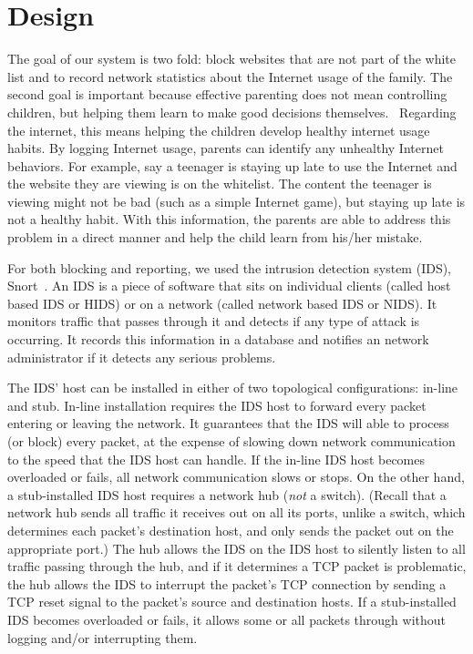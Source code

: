 
\section{Design}

The goal of our system is two fold: block websites that are not part of the
white list and to record network statistics about the Internet usage of the
family. 
%
The second goal is important because effective parenting does not mean
controlling children, but helping them learn to make good decisions
themselves.~\cite{severe}
%
Regarding the internet, this means helping the children develop healthy
internet usage habits.
%
By logging Internet usage, parents can identify any unhealthy Internet
behaviors.
%
For example, say a teenager is staying up late to use the Internet and the
website they are viewing is on the whitelist.
%
The content the teenager is viewing might not be bad (such as a simple
Internet game), but staying up late is not a healthy habit.
%
With this information, the parents are able to address this problem in a
direct manner and help the child learn from his/her mistake.

For both blocking and reporting, we used the intrusion detection system (IDS),
Snort~\cite{snort}. An IDS is a piece of software that sits on individual
clients (called host based IDS or HIDS) or on a network (called network based
IDS or NIDS). It monitors traffic that passes through it and detects if any
type of attack is occurring. It records this information in a database
and notifies an network administrator if it detects any serious problems.

The IDS' host can be installed in either of two topological configurations:
in-line and stub.
%
In-line installation requires the IDS host to forward every packet entering or
leaving the network.
%
It guarantees that the IDS will able to process (or block) every packet, at
the expense of slowing down network communication to the speed that the IDS
host can handle.
%
If the in-line IDS host becomes overloaded or fails, all network communication slows
or stops.
%
On the other hand, a stub-installed IDS host requires a network hub (\emph{not} a
switch).
%
(Recall that a network hub sends all traffic it receives out on all its ports,
unlike a switch, which determines each packet's destination host, and only
sends the packet out on the appropriate port.)
%
The hub allows the IDS on the IDS host to silently listen to all traffic
passing through the hub, and if it determines a TCP packet is problematic, the
hub allows the IDS to interrupt the packet's TCP connection by sending a TCP
reset signal to the packet's source and destination hosts.
%
If a stub-installed IDS becomes overloaded or fails, it allows some or all
packets through without logging and/or interrupting them.

